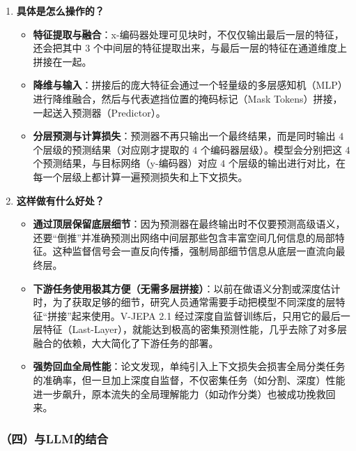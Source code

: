 \begin{enumerate}
\def\labelenumi{\arabic{enumi}.}
\tightlist
\item
  \textbf{具体是怎么操作的？}

  \begin{itemize}
  \tightlist
  \item
    \textbf{特征提取与融合}：x-编码器处理可见块时，不仅仅输出最后一层的特征，还会把其中 \(3\) 个中间层的特征提取出来，与最后一层的特征在通道维度上拼接在一起。
  \item
    \textbf{降维与输入}：拼接后的庞大特征会通过一个轻量级的多层感知机（MLP）进行降维融合，然后与代表遮挡位置的掩码标记（Mask Tokens）拼接，一起送入预测器（Predictor）。
  \item
    \textbf{分层预测与计算损失}：预测器不再只输出一个最终结果，而是同时输出 \(4\) 个层级的预测结果（对应刚才提取的 \(4\) 个编码器层级）。模型会分别把这 \(4\) 个预测结果，与目标网络（y-编码器）对应 \(4\) 个层级的输出进行对比，在每一个层级上都计算一遍预测损失和上下文损失。
  \end{itemize}
\item
  \textbf{这样做有什么好处？}

  \begin{itemize}
  \tightlist
  \item
    \textbf{通过顶层保留底层细节}：因为预测器在最终输出时不仅要预测高级语义，还要``倒推''并准确预测出网络中间层那些包含丰富空间几何信息的局部特征。这种监督信号会一直反向传播，强制局部细节信息从底层一直流向最终层。
  \item
    \textbf{下游任务使用极其方便（无需多层拼接）}：以前在做语义分割或深度估计时，为了获取足够的细节，研究人员通常需要手动把模型不同深度的层特征``拼接''起来使用。V-JEPA 2.1 经过深度自监督训练后，只用它的最后一层特征（Last-Layer），就能达到极高的密集预测性能，几乎去除了对多层融合的依赖，大大简化了下游任务的部署。
  \item
    \textbf{强势回血全局性能}：论文发现，单纯引入上下文损失会损害全局分类任务的准确率，但一旦加上深度自监督，不仅密集任务（如分割、深度）性能进一步飙升，原本流失的全局理解能力（如动作分类）也被成功挽救回来。
  \end{itemize}
\end{enumerate}

\hypertarget{ux56dbux4e0ellmux7684ux7ed3ux5408}{%
\subsubsection{（四）与LLM的结合}\label{ux56dbux4e0ellmux7684ux7ed3ux5408}}


